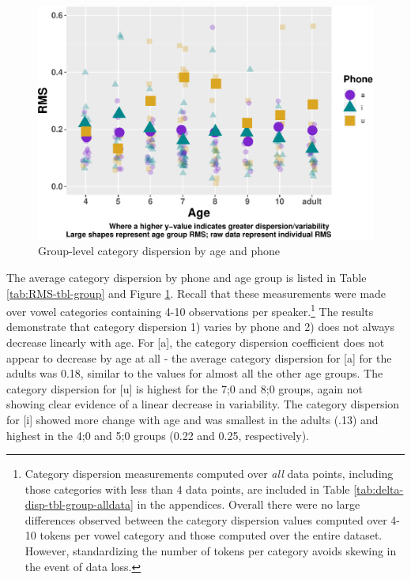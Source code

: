 \documentclass[
]{article}
\begin{document}
\begin{figure}
\centering
\includegraphics{3_vtl_results_files/figure-latex/delta-disp-fig-RMS-1.pdf}
\caption{\label{fig:delta-disp-fig-RMS}Group-level category dispersion by age and phone}
\end{figure}

The average category dispersion by phone and age group is listed in Table \ref{tab:RMS-tbl-group} and Figure \ref{fig:delta-disp-fig-RMS}. Recall that these measurements were made over vowel categories containing 4-10 observations per speaker.\footnote{Category dispersion measurements computed over \emph{all} data points, including those categories with less than 4 data points, are included in Table \ref{tab:delta-disp-tbl-group-alldata} in the appendices. Overall there were no large differences observed between the category dispersion values computed over 4-10 tokens per vowel category and those computed over the entire dataset. However, standardizing the number of tokens per category avoids skewing in the event of data loss.} The results demonstrate that category dispersion 1) varies by phone and 2) does not always decrease linearly with age. For {[}a{]}, the category dispersion coefficient does not appear to decrease by age at all - the average category dispersion for {[}a{]} for the adults was 0.18, similar to the values for almost all the other age groups. The category dispersion for {[}u{]} is highest for the 7;0 and 8;0 groups, again not showing clear evidence of a linear decrease in variability. The category dispersion for {[}i{]} showed more change with age and was smallest in the adults (.13) and highest in the 4;0 and 5;0 groups (0.22 and 0.25, respectively).
\end{document}
